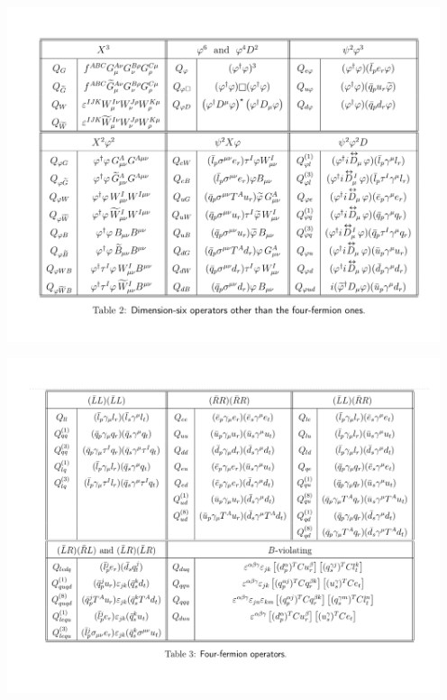 \documentclass[8pt]{beamer}
\begin{document}
\begin{frame}
  \includegraphics[width=5in]{boson.pdf}
\end{frame}
\begin{frame}
  \includegraphics[width=5in]{fermion.pdf}
\end{frame}
\end{document}
